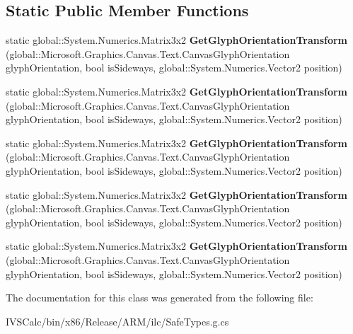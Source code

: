 \subsection*{Static Public Member Functions}
\begin{DoxyCompactItemize}
\item 
\mbox{\label{class_microsoft_1_1_graphics_1_1_canvas_1_1_text_1_1_canvas_text_layout_aab31e407f663965e71c50b5cde8cc320}} 
static global\+::\+System.\+Numerics.\+Matrix3x2 {\bfseries Get\+Glyph\+Orientation\+Transform} (global\+::\+Microsoft.\+Graphics.\+Canvas.\+Text.\+Canvas\+Glyph\+Orientation glyph\+Orientation, bool is\+Sideways, global\+::\+System.\+Numerics.\+Vector2 position)
\item 
\mbox{\label{class_microsoft_1_1_graphics_1_1_canvas_1_1_text_1_1_canvas_text_layout_aab31e407f663965e71c50b5cde8cc320}} 
static global\+::\+System.\+Numerics.\+Matrix3x2 {\bfseries Get\+Glyph\+Orientation\+Transform} (global\+::\+Microsoft.\+Graphics.\+Canvas.\+Text.\+Canvas\+Glyph\+Orientation glyph\+Orientation, bool is\+Sideways, global\+::\+System.\+Numerics.\+Vector2 position)
\item 
\mbox{\label{class_microsoft_1_1_graphics_1_1_canvas_1_1_text_1_1_canvas_text_layout_aab31e407f663965e71c50b5cde8cc320}} 
static global\+::\+System.\+Numerics.\+Matrix3x2 {\bfseries Get\+Glyph\+Orientation\+Transform} (global\+::\+Microsoft.\+Graphics.\+Canvas.\+Text.\+Canvas\+Glyph\+Orientation glyph\+Orientation, bool is\+Sideways, global\+::\+System.\+Numerics.\+Vector2 position)
\item 
\mbox{\label{class_microsoft_1_1_graphics_1_1_canvas_1_1_text_1_1_canvas_text_layout_aab31e407f663965e71c50b5cde8cc320}} 
static global\+::\+System.\+Numerics.\+Matrix3x2 {\bfseries Get\+Glyph\+Orientation\+Transform} (global\+::\+Microsoft.\+Graphics.\+Canvas.\+Text.\+Canvas\+Glyph\+Orientation glyph\+Orientation, bool is\+Sideways, global\+::\+System.\+Numerics.\+Vector2 position)
\item 
\mbox{\label{class_microsoft_1_1_graphics_1_1_canvas_1_1_text_1_1_canvas_text_layout_aab31e407f663965e71c50b5cde8cc320}} 
static global\+::\+System.\+Numerics.\+Matrix3x2 {\bfseries Get\+Glyph\+Orientation\+Transform} (global\+::\+Microsoft.\+Graphics.\+Canvas.\+Text.\+Canvas\+Glyph\+Orientation glyph\+Orientation, bool is\+Sideways, global\+::\+System.\+Numerics.\+Vector2 position)
\end{DoxyCompactItemize}


The documentation for this class was generated from the following file\+:\begin{DoxyCompactItemize}
\item 
I\+V\+S\+Calc/bin/x86/\+Release/\+A\+R\+M/ilc/Safe\+Types.\+g.\+cs\end{DoxyCompactItemize}

